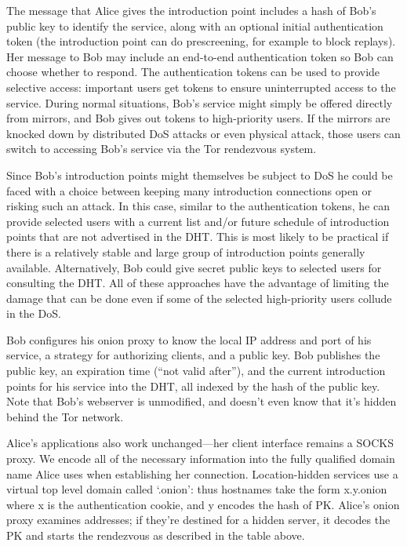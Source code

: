 \documentclass[times,10pt,twocolumn]{article}
\begin{document}
The message that Alice gives
the introduction point includes a hash of Bob's public key to identify
the service, along with an optional initial authentication token (the
introduction point can do prescreening, for example to block replays). Her
message to Bob may include an end-to-end authentication token so Bob
can choose whether to respond.
The authentication tokens can be used to provide selective access:
important users get tokens to ensure uninterrupted access to the
service. During normal situations, Bob's service might simply be offered
directly from mirrors, and Bob gives out tokens to high-priority users. If
the mirrors are knocked down by distributed DoS attacks or even
physical attack, those users can switch to accessing Bob's service via
the Tor rendezvous system.

Since Bob's introduction points might themselves be subject to DoS he
could be faced with a choice between keeping many
introduction connections open or risking such an attack. In this case,
similar to the authentication tokens, he can provide selected users
with a current list and/or future schedule of introduction points that
are not advertised in the DHT\@. This is most likely to be practical
if there is a relatively stable and large group of introduction points
generally available. Alternatively, Bob could give secret public keys
to selected users for consulting the DHT\@. All of these approaches
have the advantage of limiting the damage that can be done even if
some of the selected high-priority users collude in the DoS\@.



Bob configures his onion proxy to know the local IP address and port of his
service, a strategy for authorizing clients, and a public key. Bob
publishes the public key, an expiration time (``not valid after''), and
the current introduction points for his service into the DHT, all indexed
by the hash of the public key. Note that Bob's webserver is unmodified,
and doesn't even know that it's hidden behind the Tor network.

Alice's applications also work unchanged---her client interface
remains a SOCKS proxy. We encode all of the necessary information
into the fully qualified domain name Alice uses when establishing her
connection. Location-hidden services use a virtual top level domain
called `.onion': thus hostnames take the form x.y.onion where x is the
authentication cookie, and y encodes the hash of PK. Alice's onion proxy
examines addresses; if they're destined for a hidden server, it decodes
the PK and starts the rendezvous as described in the table above.
\end{document}
